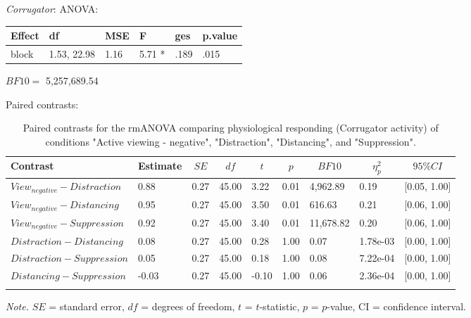 \documentclass[
  english,
  man,floatsintext]{apa6}
\begin{document}
\emph{Corrugator}:
ANOVA:

\begin{tabular}{l|l|l|l|l|l}
\hline
Effect & df & MSE & F & ges & p.value\\
\hline
block & 1.53, 22.98 & 1.16 & 5.71 * & .189 & .015\\
\hline
\end{tabular}

\(BF10=\) 5,257,689.54

Paired contrasts:

\begin{table}[H]

\begin{center}
\begin{threeparttable}

\caption{\label{tab:unnamed-chunk-7}Paired contrasts for the rmANOVA comparing physiological responding (Corrugator activity) of conditions "Active viewing - negative", "Distraction", "Distancing", and "Suppression".}

\begin{tabular}{lllllllll}
\toprule
Contrast & \multicolumn{1}{c}{Estimate} & \multicolumn{1}{c}{$SE$} & \multicolumn{1}{c}{$df$} & \multicolumn{1}{c}{$t$} & \multicolumn{1}{c}{$p$} & \multicolumn{1}{c}{$BF10$} & \multicolumn{1}{c}{$\eta_{p}^{2}$} & \multicolumn{1}{c}{$95\% CI$}\\
\midrule
$View_{negative} - Distraction$ & 0.88 & 0.27 & 45.00 & 3.22 & 0.01 & 4,962.89 & 0.19 & {}[0.05, 1.00]\\
$View_{negative} - Distancing$ & 0.95 & 0.27 & 45.00 & 3.50 & 0.01 & 616.63 & 0.21 & {}[0.06, 1.00]\\
$View_{negative} - Suppression$ & 0.92 & 0.27 & 45.00 & 3.40 & 0.01 & 11,678.82 & 0.20 & {}[0.06, 1.00]\\
$Distraction - Distancing$ & 0.08 & 0.27 & 45.00 & 0.28 & 1.00 & 0.07 & 1.78e-03 & {}[0.00, 1.00]\\
$Distraction - Suppression$ & 0.05 & 0.27 & 45.00 & 0.18 & 1.00 & 0.08 & 7.22e-04 & {}[0.00, 1.00]\\
$Distancing - Suppression$ & -0.03 & 0.27 & 45.00 & -0.10 & 1.00 & 0.06 & 2.36e-04 & {}[0.00, 1.00]\\
\bottomrule
\addlinespace
\end{tabular}

\begin{tablenotes}[para]
\normalsize{\textit{Note.} $SE$ = standard error, $df$ = degrees of freedom, $t$ = $t$-statistic, $p$ = $p$-value, CI = confidence interval.}
\end{tablenotes}

\end{threeparttable}
\end{center}

\end{table}
\end{document}
